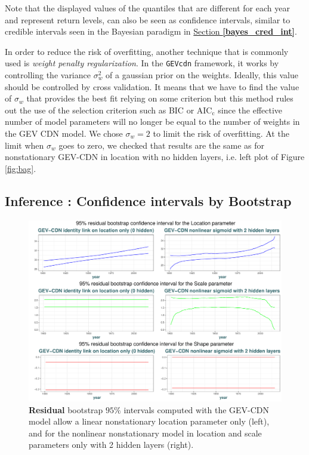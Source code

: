 Note that the displayed values of the quantiles that are different for each year and represent return levels, can also be seen as confidence intervals, similar to credible intervals seen in the Bayesian paradigm in \hyperref[bayes_cred_int]{Section \textbf{\ref{bayes_cred_int}}}.
 
  In order to reduce the risk of overfitting, another technique that is commonly used is  \emph{weight penalty regularization}. In the \texttt{GEVcdn} framework, it works by controlling the variance $\sigma^2_w$ of a gaussian prior on the weights. %
 Ideally, this value should be controlled by cross validation. It means that we have to find the value of $\sigma_w$ that provides the best fit relying on some criterion but this method rules out the use of the selection criterion such as BIC or $\text{AIC}_{\text{c}}$ since the effective number of model parameters will no longer be equal to the number of weights in the GEV CDN model. We chose $\sigma_w=2$ to limit the risk of overfitting. At the limit when $\sigma_w$ goes to zero, we checked that results are the same as for nonstationary GEV-CDN in location with no hidden layers, i.e. left plot of Figure \ref{fig:bag}.
 
 
\subsection{Inference : Confidence intervals by Bootstrap }
 
 
 
 \begin{figure}[!htb]
   	\centering	\includegraphics[width=1.01\linewidth]{g_boot_res.pdf}\caption{\textbf{Residual} bootstrap $95\%$ intervals computed with the GEV-CDN model allow a linear nonstationary location parameter only (left), and for the nonlinear nonstationary model in location and scale parameters only with 2 hidden layers (right). }\label{fig:boot_res}
 \end{figure}
   
